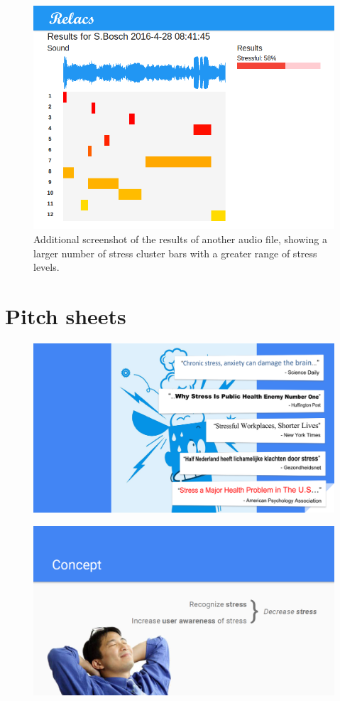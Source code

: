 \documentclass[a4paper]{article}
\begin{document}
\begin{figure}[h]
\centering
\includegraphics[width=0.65\linewidth]{./Audio2Results}
\caption{Additional screenshot of the results of another audio file, showing a larger number of stress cluster bars with a greater range of stress levels.}
\label{fig:Audio2}
\end{figure}

\section{Pitch sheets}

\begin{figure}[h]
\centering
\includegraphics[width=\linewidth]{./Slide1}
\label{fig:Slide1}
\end{figure}

\begin{figure}[h]
\centering
\includegraphics[width=\linewidth]{./Slide2}
\label{fig:Slide2}
\end{figure}
\end{document}
